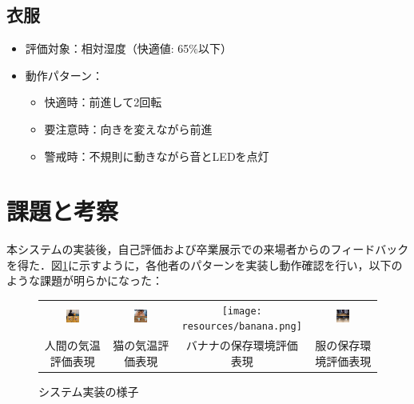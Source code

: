 \documentclass{cuxarticle}
\begin{document}
\subsection{衣服}
\begin{itemize}
  \item 評価対象：相対湿度（快適値: 65\%以下）\cite{--クローゼ}
  \item 動作パターン：
    \begin{itemize}
      \item 快適時：前進して2回転
      \item 要注意時：向きを変えながら前進
      \item 警戒時：不規則に動きながら音とLEDを点灯
    \end{itemize}
\end{itemize}

\section{課題と考察}
本システムの実装後，自己評価および卒業展示での来場者からのフィードバックを得た．図\ref{fig:system-test}に示すように，各他者のパターンを実装し動作確認を行い，以下のような課題が明らかになった：

\begin{figure}[h]
  \centering
  \begin{tabular}{cccc}
    \includegraphics[width=0.22\textwidth]{resources/human.png} &
    \includegraphics[width=0.22\textwidth]{resources/cat.png} &
    \texttt{[image: resources/banana.png]} &
    \includegraphics[width=0.22\textwidth]{resources/clothes.png} \\
    人間の気温評価表現 & 猫の気温評価表現 & バナナの保存環境評価表現 & 服の保存環境評価表現
  \end{tabular}
  \caption{システム実装の様子}
  \label{fig:system-test}
\end{figure}
\end{document}
